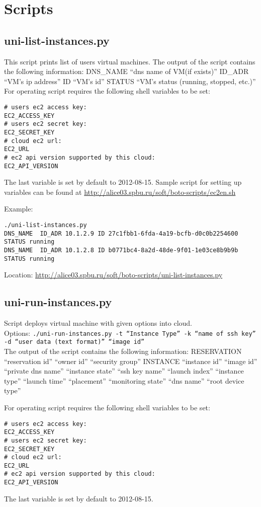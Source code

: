 \chapter{Scripts}
\label{apx:scripts}


\section{uni-list-instances.py}
This script prints list of users virtual machines.
The output of the script contains the following information: DNS\_NAME ``dns name of VM(if exists)''  ID\_ADR ``VM's ip address'' ID ``VM's id'' STATUS ``VM's status (running, stopped, etc.)''
For operating script requires the following shell variables to be set:
\begin{lstlisting}
# users ec2 access key:
EC2_ACCESS_KEY 
# users ec2 secret key:
EC2_SECRET_KEY
# cloud ec2 url:
EC2_URL
# ec2 api version supported by this cloud:
EC2_API_VERSION
\end{lstlisting}
The last variable is set by default to 2012-08-15.
Sample script for setting up variables can be found at \url{http://alice03.spbu.ru/soft/boto-scripts/ec2en.sh}

\noindent Example:
\begin{lstlisting}
./uni-list-instances.py
DNS_NAME  ID_ADR 10.1.2.9 ID 27c1fbb1-6fda-4a19-bcfb-d0c0b2254600 STATUS running
DNS_NAME  ID_ADR 10.1.2.8 ID b0771bc4-8a2d-48de-9f01-1e03ce8b9b9b STATUS running
\end{lstlisting}
Location: \url{http://alice03.spbu.ru/soft/boto-scripts/uni-list-instances.py}


\section{uni-run-instances.py}
Script deploys virtual machine with given options into cloud.\\
Options: \texttt{./uni-run-instances.py  -t ``Instance Type'' -k ``name of ssh key'' -d ``user data (text format)'' ``image id''}\\
The output of the script contains the following information: RESERVATION    ``reservation id''    ``owner id''    ``security group'' INSTANCE        ``instance id''      ``image id''    ``private dns name''     ``instance state''  ``ssh key name''   ``launch index''       ``instance type''      ``launch time''  ``placement''    ``monitoring state''    ``dns name'' ``root device type''

For operating script requires the following shell variables to be set:
\begin{lstlisting}
# users ec2 access key:
EC2_ACCESS_KEY 
# users ec2 secret key:
EC2_SECRET_KEY
# cloud ec2 url:
EC2_URL
# ec2 api version supported by this cloud:
EC2_API_VERSION
\end{lstlisting}
The last variable is set by default to 2012-08-15.

